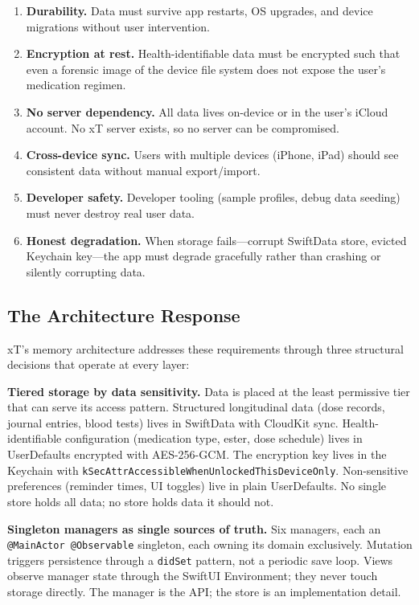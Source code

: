 \documentclass[11pt,a4paper]{article}
\newcommand{\code}[1]{\texttt{\small #1}}
\begin{document}
\begin{enumerate}[nosep,leftmargin=1.4em]
\item \textbf{Durability.} Data must survive app restarts, OS upgrades, and
  device migrations without user intervention.
\item \textbf{Encryption at rest.} Health-identifiable data must be encrypted
  such that even a forensic image of the device file system does not expose
  the user's medication regimen.
\item \textbf{No server dependency.} All data lives on-device or in the
  user's iCloud account. No xT server exists, so no server can be
  compromised.
\item \textbf{Cross-device sync.} Users with multiple devices (iPhone, iPad)
  should see consistent data without manual export/import.
\item \textbf{Developer safety.} Developer tooling (sample profiles, debug
  data seeding) must never destroy real user data.
\item \textbf{Honest degradation.} When storage fails---corrupt SwiftData
  store, evicted Keychain key---the app must degrade gracefully rather than
  crashing or silently corrupting data.
\end{enumerate}

\subsection{The Architecture Response}
\label{sec:architecture_response}

xT's memory architecture addresses these requirements through three
structural decisions that operate at every layer:

\textbf{Tiered storage by data sensitivity.} Data is placed at the least
permissive tier that can serve its access pattern. Structured longitudinal
data (dose records, journal entries, blood tests) lives in SwiftData with
CloudKit sync. Health-identifiable configuration (medication type, ester,
dose schedule) lives in UserDefaults encrypted with AES-256-GCM. The
encryption key lives in the Keychain with
\code{kSecAttrAccessibleWhenUnlockedThisDeviceOnly}. Non-sensitive
preferences (reminder times, UI toggles) live in plain UserDefaults. No
single store holds all data; no store holds data it should not.

\textbf{Singleton managers as single sources of truth.} Six managers, each an
\code{@MainActor @Observable} singleton, each owning its domain exclusively.
Mutation triggers persistence through a \code{didSet} pattern, not a periodic
save loop. Views observe manager state through the SwiftUI Environment; they
never touch storage directly. The manager is the API; the store is an
implementation detail.
\end{document}
